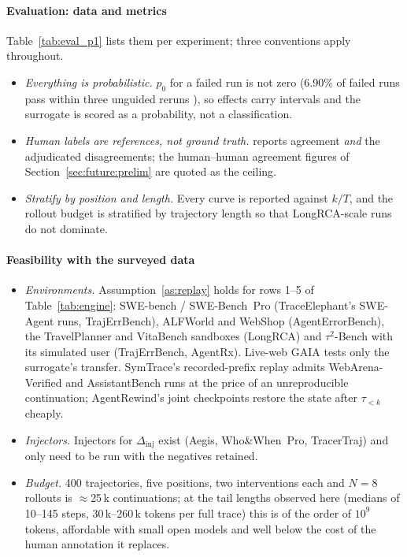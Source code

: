 \paragraph{Evaluation: data and metrics} Table~\ref{tab:eval_p1} lists them per experiment; three conventions apply throughout.
\begin{itemize}[leftmargin=1.1em]
\item \emph{Everything is probabilistic.} $p_0$ for a failed run is not zero (6.90\% of failed runs pass within three unguided reruns \cite{luan2026symtrace}), so effects carry intervals and the surrogate is scored as a probability, not a classification.
\item \emph{Human labels are references, not ground truth.}  reports agreement \emph{and} the adjudicated disagreements; the human--human agreement figures of Section~\ref{sec:future:prelim} are quoted as the ceiling.
\item \emph{Stratify by position and length.} Every curve is reported against $k/T$, and the rollout budget is stratified by trajectory length so that LongRCA-scale runs do not dominate.
\end{itemize}

\paragraph{Feasibility with the surveyed data}
\begin{itemize}[leftmargin=1.1em]
\item \emph{Environments.} Assumption~\ref{as:replay} holds for rows 1--5 of Table~\ref{tab:engine}: SWE-bench / SWE-Bench~Pro (TraceElephant's SWE-Agent runs, TrajErrBench), ALFWorld and WebShop (AgentErrorBench), the TravelPlanner and VitaBench sandboxes (LongRCA) and $\tau^2$-Bench with its simulated user (TrajErrBench, AgentRx). Live-web GAIA tests only the surrogate's transfer. SymTrace's recorded-prefix replay admits WebArena-Verified and AssistantBench runs at the price of an unreproducible continuation; AgentRewind's joint checkpoints \cite{zhuang2026agentrewind} restore the state after $\tau_{<k}$ cheaply.
\item \emph{Injectors.} Injectors for $\Delta_{\mathrm{inj}}$ exist (Aegis, Who\&When~Pro, TracerTraj) and only need to be run with the negatives retained.
\item \emph{Budget.} 400 trajectories, five positions, two interventions each and $N=8$ rollouts is $\approx$25\,k continuations; at the tail lengths observed here (medians of 10--145 steps, 30\,k--260\,k tokens per full trace) this is of the order of $10^9$ tokens, affordable with small open models and well below the cost of the human annotation it replaces.
\end{itemize}

